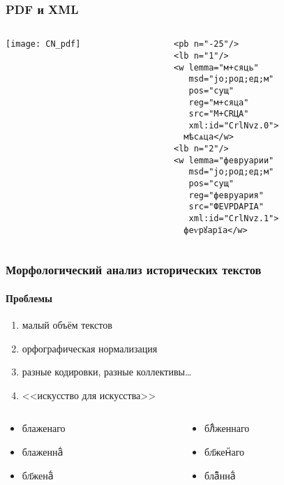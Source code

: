 \begin{frame}[fragile]
  \frametitle{PDF и XML}

  \begin{columns}[c]
    \begin{column}{6cm}
      \texttt{[image: CN\_pdf]}
    \end{column}

    \begin{column}{6cm}
      \begin{Verbatim}[fontsize=\footnotesize]
<pb n="-25"/>
<lb n="1"/>
<w lemma="м+сяць"
   msd="jo;род;ед;м"
   pos="сущ"
   reg="м+сяца"
   src="М+СRЦА"
   xml:id="CrlNvz.0">
  мѣсѧца</w>
<lb n="2"/>
<w lemma="февруарии"
   msd="jo;род;ед;м"
   pos="сущ"
   reg="февруария"
   src="ФЕVРDАРIА"
   xml:id="CrlNvz.1">
  феѵрꙋарїа</w>
\end{Verbatim}
    \end{column}
  \end{columns}
\end{frame}

\begin{frame}
  \frametitle{Морфологический анализ исторических текстов}
  \framesubtitle{Проблемы}

  \begin{enumerate}
    \item малый объём текстов
    \item<2-> орфографическая нормализация
    \item<3-> разные кодировки, разные коллективы\ldots
    \item<4-> <<искусство для искусства>>
  \end{enumerate}

  \begin{columns}[c]
    \begin{column}{5cm}
      \begin{itemize}
        \item {\agio блаженаго}
        \item {\agio блаженна҇ⷢ}
        \item {\agio бл҃жена҇ⷢ}
      \end{itemize}
    \end{column}

    \begin{column}{5cm}
      \begin{itemize}
        \item {\agio бл҇ⷶженнаго}
        \item {\agio бл҃женⷩаго}
        \item {\agio бла҇ⷤнна҇ⷢ}
      \end{itemize}
    \end{column}
  \end{columns}
\end{frame}

